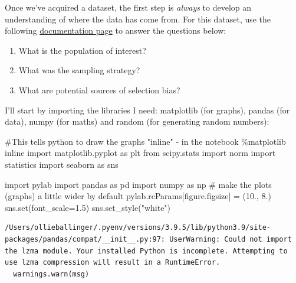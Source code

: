 \documentclass[
  letterpaper,
  DIV=11,
  numbers=noendperiod]{scrreprt}
\newenvironment{Shaded}{\begin{snugshade}}{\end{snugshade}}
\newcommand{\BuiltInTok}[1]{\textcolor[rgb]{0.00,0.23,0.31}{#1}}
\newcommand{\CommentTok}[1]{\textcolor[rgb]{0.37,0.37,0.37}{#1}}
\newcommand{\FloatTok}[1]{\textcolor[rgb]{0.68,0.00,0.00}{#1}}
\newcommand{\ImportTok}[1]{\textcolor[rgb]{0.00,0.46,0.62}{#1}}
\newcommand{\NormalTok}[1]{\textcolor[rgb]{0.00,0.23,0.31}{#1}}
\newcommand{\OperatorTok}[1]{\textcolor[rgb]{0.37,0.37,0.37}{#1}}
\newcommand{\StringTok}[1]{\textcolor[rgb]{0.13,0.47,0.30}{#1}}
\providecommand{\tightlist}{%
  \setlength{\itemsep}{0pt}\setlength{\parskip}{0pt}}\usepackage{longtable,booktabs,array}
\begin{document}
Once we've acquired a dataset, the first step is \emph{always} to
develop an understanding of where the data has come from. For this
dataset, use the following
\href{https://www.census.gov/programs-surveys/cps/technical-documentation/methodology.html}{documentation
page} to answer the questions below:

\begin{enumerate}
\def\labelenumi{\arabic{enumi})}
\tightlist
\item
  What is the population of interest?
\item
  What was the sampling strategy?
\item
  What are potential sources of selection bias?
\end{enumerate}

I'll start by importing the libraries I need: matplotlib (for graphs),
pandas (for data), numpy (for maths) and random (for generating random
numbers):

\begin{Shaded}
\begin{Highlighting}[]
\CommentTok{\#This tells python to draw the graphs "inline" {-} in the notebook}
\OperatorTok{\%}\NormalTok{matplotlib inline  }
\ImportTok{import}\NormalTok{ matplotlib.pyplot }\ImportTok{as}\NormalTok{ plt}
\ImportTok{from}\NormalTok{ scipy.stats }\ImportTok{import}\NormalTok{ norm}
\ImportTok{import}\NormalTok{ statistics}
\ImportTok{import}\NormalTok{ seaborn }\ImportTok{as}\NormalTok{ sns}

\ImportTok{import}\NormalTok{ pylab}
\ImportTok{import}\NormalTok{ pandas }\ImportTok{as}\NormalTok{ pd}
\ImportTok{import}\NormalTok{ numpy }\ImportTok{as}\NormalTok{ np}
\CommentTok{\# make the plots (graphs) a little wider by default}
\NormalTok{pylab.rcParams[}\StringTok{\textquotesingle{}figure.figsize\textquotesingle{}}\NormalTok{] }\OperatorTok{=}\NormalTok{ (}\FloatTok{10.}\NormalTok{, }\FloatTok{8.}\NormalTok{)}
\NormalTok{sns.}\BuiltInTok{set}\NormalTok{(font\_scale}\OperatorTok{=}\FloatTok{1.5}\NormalTok{)}
\NormalTok{sns.set\_style(}\StringTok{"white"}\NormalTok{)}
\end{Highlighting}
\end{Shaded}

\begin{verbatim}
/Users/ollieballinger/.pyenv/versions/3.9.5/lib/python3.9/site-packages/pandas/compat/__init__.py:97: UserWarning: Could not import the lzma module. Your installed Python is incomplete. Attempting to use lzma compression will result in a RuntimeError.
  warnings.warn(msg)
\end{verbatim}
\end{document}
